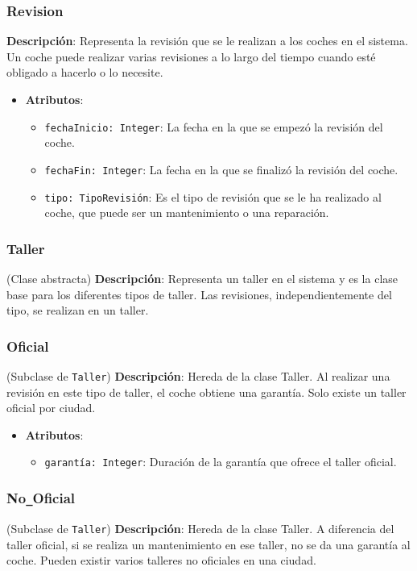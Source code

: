 \documentclass[12pt.a4paper]{article}
\begin{document}
\subsubsection{Revision}
\textbf{Descripción}: Representa la revisión que se le realizan a los coches en el sistema. Un coche puede realizar varias revisiones a lo largo del tiempo cuando esté obligado a hacerlo o lo necesite.
\begin{itemize}
    \item \textbf{Atributos}:
    \begin{itemize}
        \item \texttt{fechaInicio: Integer}: La fecha en la que se empezó la revisión del coche.
        \item \texttt{fechaFin: Integer}: La fecha en la que se finalizó la revisión del coche.
        \item \texttt{tipo: TipoRevisión}: Es el tipo de revisión que se le ha realizado al coche, que puede ser un mantenimiento o una reparación.
    \end{itemize}
\end{itemize}

\subsubsection{Taller} (Clase abstracta)
\textbf{Descripción}:  Representa un taller en el sistema y es la clase base para los diferentes tipos de taller. Las revisiones, independientemente del tipo, se realizan en un taller. 

\subsubsection{Oficial} (Subclase de \texttt{Taller})
\textbf{Descripción}:  Hereda de la clase Taller. Al realizar una revisión en este tipo de taller, el coche obtiene una garantía. Solo existe un taller oficial por ciudad.
\begin{itemize}
    \item \textbf{Atributos}:
    \begin{itemize}
        \item \texttt{garantía: Integer}: Duración de la garantía que ofrece el taller oficial.
    \end{itemize}
\end{itemize}

\subsubsection{No\texttt{\_}Oficial} (Subclase de \texttt{Taller})
\textbf{Descripción}:  Hereda de la clase Taller. A diferencia del taller oficial, si se realiza un mantenimiento en ese taller, no se da una garantía al coche. Pueden existir varios talleres no oficiales en una ciudad.
\end{document}
